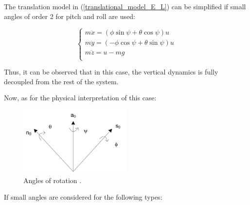 \documentclass{thesisreport}
\begin{document}
The translation model in (\ref{translational_model_E_L}) can be simplified if small angles of order 2 for pitch and roll are used:



\begin{equation}\label{translational_model_E_L_Simplified}
\begin{cases}
m \ddot{x} = (\phi \sin \psi + \theta \cos \psi)u \\
m \ddot{y} = (- \phi \cos \psi + \theta \sin \psi)u \\
m \ddot{z} = u - mg \\
\end{cases}
\end{equation}

Thus, it can be observed that in this case, the vertical dynamics is fully decoupled from the rest of the system.

Now, as for the physical interpretation of this case:


\begin{figure}[h]
\centering
\includegraphics[width=0.5\textwidth]{Images/Modeling/Fantoni_b}
\caption{Angles of rotation \cite{Fantoni2016}.}
\label{Fantoni_b}
\end{figure}

\newpage

If small angles are considered for the following types:
\end{document}
